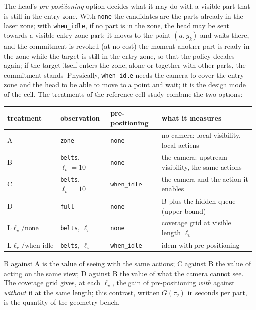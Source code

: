 \documentclass[11pt,a4paper]{article}
\newcommand{\tv}{\tau_{v}}
\newcommand{\lv}{\ell_{v}}
\begin{document}
The head's \emph{pre-positioning} option decides what it may do with a visible part that
is still in the entry zone. With \texttt{none} the candidates are the parts already in
the laser zone; with \texttt{when\_idle}, if no part is in the zone, the head may be sent
towards a visible entry-zone part: it moves to the point $(a,y_k)$ and waits there, and
the commitment is revoked (at no cost) the moment another part is ready in the zone while
the target is still in the entry zone, so that the policy decides again; if the target itself enters the zone, alone or together with other
parts, the commitment stands. Physically, \texttt{when\_idle} needs the camera to cover the entry
zone and the head to be able to move to a point and wait; it is the design mode of the
cell. The treatments of the reference-cell study combine the two options:
\begin{center}
\begin{tabularx}{\linewidth}{@{}l l l X@{}}
\toprule
treatment & observation & pre-positioning & what it measures\\
\midrule
A & \texttt{zone} & \texttt{none} & no camera: local visibility, local actions\\
B & \texttt{belts}, $\lv=10$ & \texttt{none} & the camera: upstream visibility, the same actions\\
C & \texttt{belts}, $\lv=10$ & \texttt{when\_idle} & the camera and the action it enables\\
D & \texttt{full} & \texttt{none} & B plus the hidden queue (upper bound)\\
\midrule
$\mathrm{L}\lv/\mathrm{none}$ & \texttt{belts}, $\lv$ & \texttt{none} & coverage grid at visible length $\lv$\\
$\mathrm{L}\lv/\mathrm{when\_idle}$ & \texttt{belts}, $\lv$ & \texttt{when\_idle} & idem with pre-positioning\\
\bottomrule
\end{tabularx}
\end{center}
B against A is the value of seeing with the same actions; C against B the value of acting
on the same view; D against B the value of what the camera cannot see. The coverage grid
gives, at each $\lv$, the gain of pre-positioning \emph{with} against \emph{without} it at
the same length; this contrast, written $G(\tv)$ in seconds per part, is the quantity of
the geometry bench.
\end{document}
